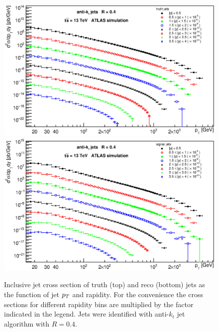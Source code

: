 \begin{appendices}
\begin{figure}[H]
  \centering
  \includegraphics[width=\textwidth]{Chapter3/ptTruthAllRapidityBins.eps}
  \includegraphics[width=\textwidth]{Chapter3/ptSignalAllRapidityBins.eps}
  \caption{Inclusive jet cross section of truth (top) and reco (bottom) jets as
    the function of jet $p_{T}$ and rapidity. For the convenience the cross
    sections for different rapidity bins are multiplied by the factor indicated
    in the legend. Jets were identified with anti-$k_t$ jet algorithm with
    $R=0.4$.}
  \label{fig:ptSpectraMasacreEverythingFuck}
\end{figure}



\end{appendices}
